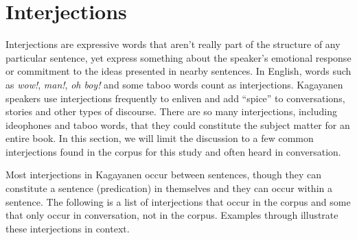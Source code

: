 \section{Interjections}
\label{bkm:Ref113971883}\label{sec:interjections}
Interjections are expressive words that aren't really part of the structure of any particular sentence, yet express something about the speaker’s emotional response or commitment to the ideas presented in nearby sentences. In English, words such as \textit{wow!}, \textit{man!}, \textit{oh boy!} and some taboo words count as interjections. Kagayanen speakers use interjections frequently to enliven and add “spice” to conversations, stories and other types of discourse. There are so many interjections, including ideophones and taboo words, that they could constitute the subject matter for an entire book. In this section, we will limit the discussion to a few common interjections found in the corpus for this study and often heard in conversation.

Most interjections in Kagayanen occur between sentences, though they can constitute a sentence (predication) in themselves and they can occur within a sentence. The following is a list of interjections that occur in the corpus and some that only occur in conversation, not in the corpus. Examples  through  illustrate these interjections in context.

